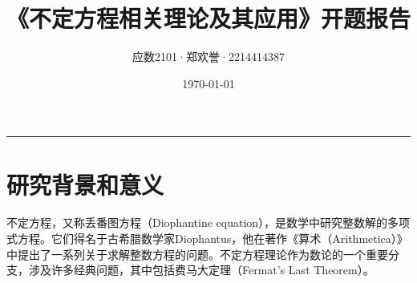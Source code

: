 \documentclass{article}
\title{《不定方程相关理论及其应用》开题报告}
\author{应数2101·郑欢誉·2214414387}
\date{\today}
\begin{document}
\maketitle
\thispagestyle{empty}
\newpage
\hrule

\part{研究背景和意义}

\noindent
不定方程，又称丢番图方程（Diophantine equation），是数学中研究整数解的多项式方程。它们得名于古希腊数学家Diophantus，他在著作《算术（Arithmetica）》中提出了一系列关于求解整数方程的问题。不定方程理论作为数论的一个重要分支，涉及许多经典问题，其中包括费马大定理（Fermat's Last Theorem）。\\
\end{document}

